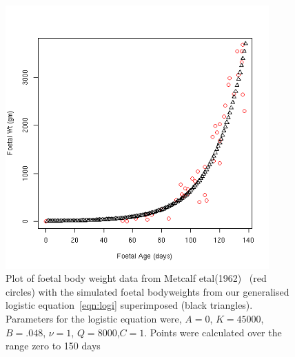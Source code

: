%

\begin{figure}[!h]
  \centering
   \includegraphics[width=0.9\textwidth]{mfbwagefit.png}
  \caption{Plot of foetal body weight data from Metcalf etal(1962)~\cite{metc:62} (red circles) with the simulated foetal bodyweights from our generalised logistic equation~\ref{eqn:logi} superimposed (black triangles). Parameters for the logistic equation were, $A=0$, $K=45000$, $B=.048$, $\nu=1$, $Q=8000$,$C=1$. Points were calculated over the range zero to 150 days}
  \label{fig:mfbwagefit}
\end{figure}

%

